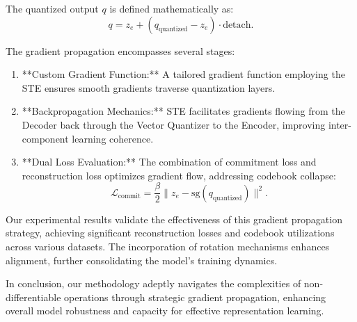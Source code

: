 The quantized output \(q\) is defined mathematically as:
\begin{equation}
q = z_e + (q_{\text{quantized}} - z_e) \cdot \text{detach}.
\end{equation}

The gradient propagation encompasses several stages:
\begin{enumerate}
    \item **Custom Gradient Function:** A tailored gradient function employing the STE ensures smooth gradients traverse quantization layers.
    \item **Backpropagation Mechanics:** STE facilitates gradients flowing from the Decoder back through the Vector Quantizer to the Encoder, improving inter-component learning coherence.
    \item **Dual Loss Evaluation:** The combination of commitment loss and reconstruction loss optimizes gradient flow, addressing codebook collapse:
    \begin{equation}
    \mathcal{L}_{\text{commit}} = \frac{\beta}{2} \lVert z_e - \text{sg}(q_{\text{quantized}}) \rVert^2.
    \end{equation}
\end{enumerate}

Our experimental results validate the effectiveness of this gradient propagation strategy, achieving significant reconstruction losses and codebook utilizations across various datasets. The incorporation of rotation mechanisms enhances alignment, further consolidating the model's training dynamics.

In conclusion, our methodology adeptly navigates the complexities of non-differentiable operations through strategic gradient propagation, enhancing overall model robustness and capacity for effective representation learning.